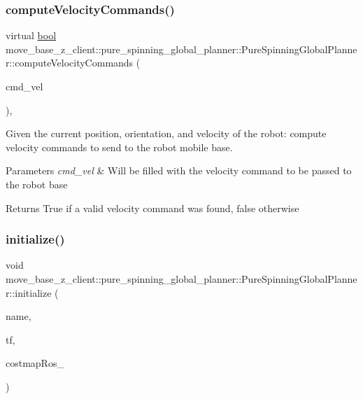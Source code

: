 \subsubsection{\texorpdfstring{compute\+Velocity\+Commands()}{computeVelocityCommands()}}
{\footnotesize\ttfamily virtual \hyperlink{classbool}{bool} move\+\_\+base\+\_\+z\+\_\+client\+::pure\+\_\+spinning\+\_\+global\+\_\+planner\+::\+Pure\+Spinning\+Global\+Planner\+::compute\+Velocity\+Commands (\begin{DoxyParamCaption}\item[{geometry\+\_\+msgs\+::\+Twist \&}]{cmd\+\_\+vel }\end{DoxyParamCaption})\hspace{0.3cm}{\ttfamily [override]}, {\ttfamily [virtual]}}



Given the current position, orientation, and velocity of the robot\+: compute velocity commands to send to the robot mobile base. 


\begin{DoxyParams}{Parameters}
{\em cmd\+\_\+vel} & Will be filled with the velocity command to be passed to the robot base \\
\hline
\end{DoxyParams}
\begin{DoxyReturn}{Returns}
True if a valid velocity command was found, false otherwise 
\end{DoxyReturn}
\mbox{\label{classmove__base__z__client_1_1pure__spinning__global__planner_1_1PureSpinningGlobalPlanner_a1186b2da8a77ad8ab0f9878de2a1db63}} 
\subsubsection{\texorpdfstring{initialize()}{initialize()}\hspace{0.1cm}{\footnotesize\ttfamily [1/3]}}
{\footnotesize\ttfamily void move\+\_\+base\+\_\+z\+\_\+client\+::pure\+\_\+spinning\+\_\+global\+\_\+planner\+::\+Pure\+Spinning\+Global\+Planner\+::initialize (\begin{DoxyParamCaption}\item[{std\+::string}]{name,  }\item[{tf\+::\+Transform\+Listener $\ast$}]{tf,  }\item[{costmap\+\_\+2d\+::\+Costmap2\+D\+R\+OS $\ast$}]{costmap\+Ros\+\_\+ }\end{DoxyParamCaption})}



